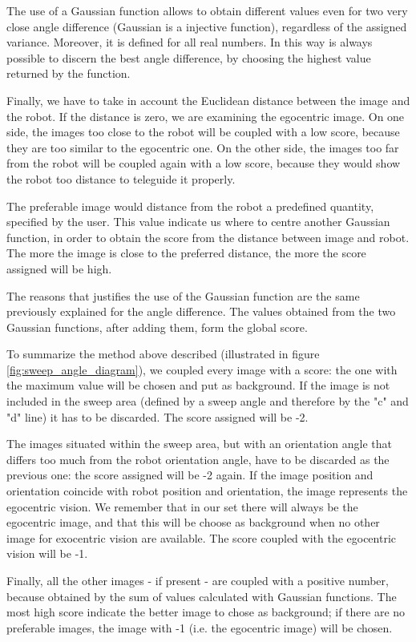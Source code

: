 %
The use of a Gaussian function allows to obtain different values even for two very close angle difference
(Gaussian is a injective function), regardless of the assigned variance. Moreover, it is defined for all real
numbers.
In this way is always possible to discern the best angle difference, by choosing the highest value returned by
the function.
%

%
Finally, we have to take in account the Euclidean distance between the image and the robot. If the distance is
zero, we are examining the egocentric image. On one side, the images too close to the robot will be coupled
with a low score, because they are too similar to the egocentric one. On the other side, the images too far
from the robot will be coupled again with a low score, because they would show the robot too distance to
teleguide it properly.
%

%
The preferable image would distance from the robot a predefined quantity, specified by the user. This value
indicate us where to centre another Gaussian function, in order to obtain the score from the distance between
image and robot. The more the image is close to the preferred distance, the more the score assigned will be high.
%

%
The reasons that justifies the use of the Gaussian function are the same previously explained for the angle
difference. The values obtained from the two Gaussian functions, after adding them, form the global score.
%

%
To summarize the method above described (illustrated in figure \ref{fig:sweep_angle_diagram}), we coupled
every image with a score: the one with the maximum value will be chosen and put as background. If the image is
not included in the sweep area (defined by a sweep angle and therefore by the "c" and "d" line) it has to be
discarded. The score assigned will be -2.
%

%
The images situated within the sweep area, but with an orientation angle that differs too much from the robot
orientation angle, have to be discarded as the previous one: the score assigned will be -2 again.
If the image position and orientation coincide with robot position and orientation, the image represents the
egocentric vision. We remember that in our set there will always be the egocentric image, and that this will be
choose as background when no other image for exocentric vision are available. The score coupled with the egocentric 
vision will be -1.
%

%
Finally, all the other images - if present - are coupled with a positive number, because obtained by the sum of
values calculated with Gaussian functions. The most high score indicate the better image to chose as background;
if there are no preferable images, the image with -1 (i.e. the egocentric image) will be chosen.
%


